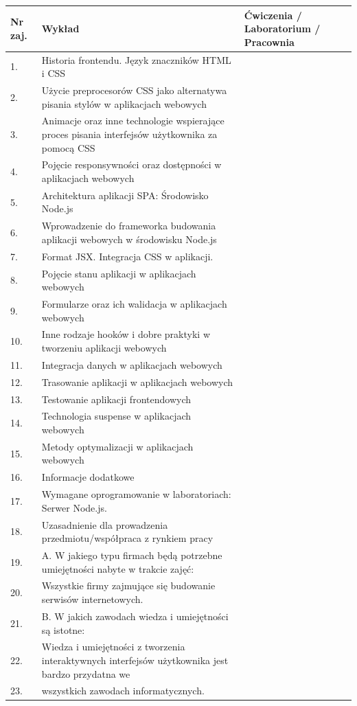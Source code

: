 \documentclass[12pt, a4paper]{article}
\begin{document}
\begin{longtable}{|p{1.5cm}|p{6.5cm}|p{6.5cm}|}
\hline
\textbf{Nr zaj.} & \textbf{Wykład} & \textbf{Ćwiczenia / Laboratorium / Pracownia} \\\hline
\endhead
  \hline
  1. & Historia frontendu. Język znaczników HTML i CSS &  \\
  \hline
  2. & Użycie preprocesorów CSS jako alternatywa pisania stylów w aplikacjach webowych &  \\
  \hline
  3. & Animacje oraz inne technologie wspierające proces pisania interfejsów użytkownika za pomocą CSS &  \\
  \hline
  4. & Pojęcie responsywności oraz dostępności w aplikacjach webowych &  \\
  \hline
  5. & Architektura aplikacji SPA: Środowisko Node.js &  \\
  \hline
  6. & Wprowadzenie do frameworka budowania aplikacji webowych w środowisku Node.js &  \\
  \hline
  7. & Format JSX. Integracja CSS w aplikacji. &  \\
  \hline
  8. & Pojęcie stanu aplikacji w aplikacjach webowych &  \\
  \hline
  9. & Formularze oraz ich walidacja w aplikacjach webowych &  \\
  \hline
  10. & Inne rodzaje hooków i dobre praktyki w tworzeniu aplikacji webowych &  \\
  \hline
  11. & Integracja danych w aplikacjach webowych &  \\
  \hline
  12. & Trasowanie aplikacji w aplikacjach webowych &  \\
  \hline
  13. & Testowanie aplikacji frontendowych &  \\
  \hline
  14. & Technologia suspense w aplikacjach webowych &  \\
  \hline
  15. & Metody optymalizacji w aplikacjach webowych &  \\
  \hline
  16. & Informacje dodatkowe &  \\
  \hline
  17. & Wymagane oprogramowanie w laboratoriach: Serwer Node.js. &  \\
  \hline
  18. & Uzasadnienie dla prowadzenia przedmiotu/współpraca z rynkiem pracy &  \\
  \hline
  19. & A. W jakiego typu firmach będą potrzebne umiejętności nabyte w trakcie zajęć: &  \\
  \hline
  20. & Wszystkie firmy zajmujące się budowanie serwisów internetowych. &  \\
  \hline
  21. & B. W jakich zawodach wiedza i umiejętności są istotne: &  \\
  \hline
  22. & Wiedza i umiejętności z tworzenia interaktywnych interfejsów użytkownika jest bardzo przydatna we &  \\
  \hline
  23. & wszystkich zawodach informatycznych. &  \\
  \hline
\end{longtable}
\end{document}
